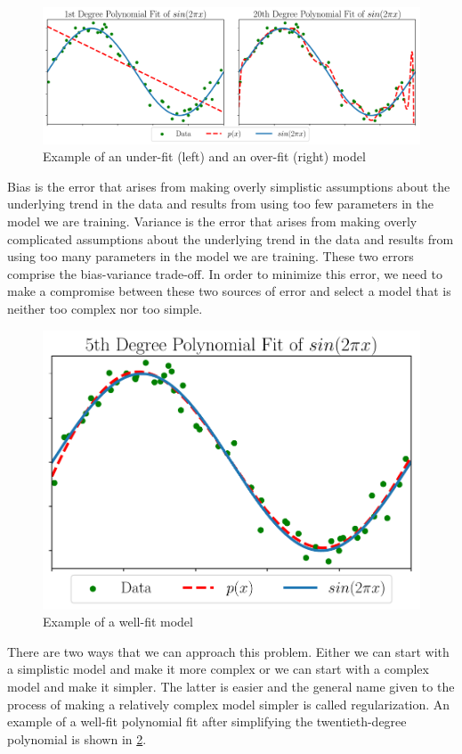 \begin{figure}[!ht]
	\centering
	\includegraphics[height=0.35\linewidth]{pictures/poly_fit.pdf}
	\caption[Example of an under-fit and an over-fit model]{Example of an under-fit (left) and an over-fit (right) model}\label{fig:overfit}  
\end{figure}

Bias is the error that arises from making overly simplistic assumptions about the underlying trend in the data and results from using too few parameters in the model we are training. Variance is the error that arises from making overly complicated assumptions about the underlying trend in the data and results from using too many parameters in the model we are training. These two errors comprise the bias-variance trade-off. In order to minimize this error, we need to make a compromise between these two sources of error and select a model that is neither too complex nor too simple.

\begin{figure}[!ht]
	\centering
	\includegraphics[height=0.35\linewidth]{pictures/poly_fit_correct.pdf}
	\caption{Example of a well-fit model}\label{fig:wellfit}  
\end{figure}

There are two ways that we can approach this problem. Either we can start with a simplistic model and make it more complex or we can start with a complex model and make it simpler. The latter is easier and the general name given to the process of making a relatively complex model simpler is called regularization. An example of a well-fit polynomial fit after simplifying the twentieth-degree polynomial is shown in \cref{fig:wellfit}.

